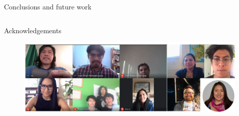 {\begin{frame}{Conclusions and future work}
\begin{columns}
\begin{column}{.3\linewidth}
    \end{column}
  \end{columns}

\end{frame}
}


{
\begin{frame}{Acknowledgements}

  \begin{figure}
  \centering
  \includegraphics[width=1.0\textwidth]{./figures/team/outputs/drawing-v00.png}
  \end{figure}

\end{frame}
}

